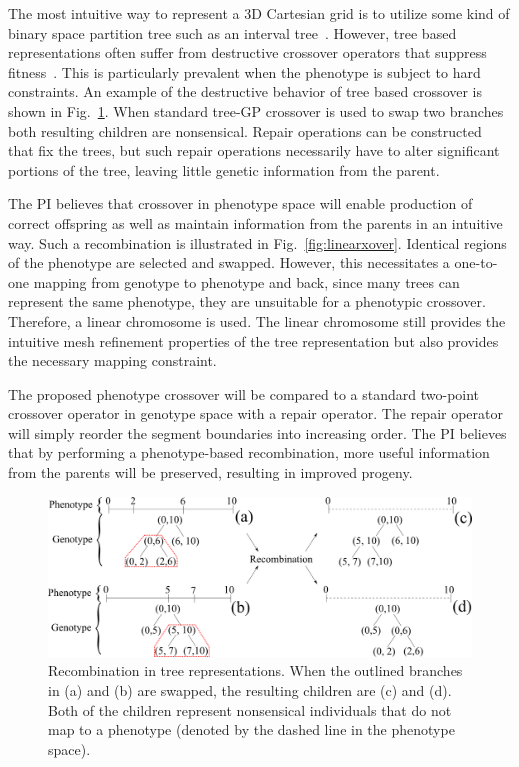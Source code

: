\documentclass{article}
\begin{document}
The most intuitive way to represent a 3D Cartesian grid is to utilize some kind of binary space partition tree such as an interval tree~\cite{ref:Franco1985}. However, tree based representations often suffer from destructive crossover operators that suppress fitness~\cite{ref:Sheneman2006}. This is particularly prevalent when the phenotype is subject to hard constraints. An example of the destructive behavior of tree based crossover is shown in Fig.~\ref{fig:treefail}. When standard tree-GP crossover is used to swap two branches both resulting children are nonsensical. Repair operations can be constructed that fix the trees, but such repair operations necessarily have to alter significant portions of the tree, leaving little genetic information from the parent.

The PI believes that crossover in phenotype space will enable production of correct offspring as well as maintain information from the parents in an intuitive way. Such a recombination is illustrated in Fig.~\ref{fig:linearxover}. Identical regions of the phenotype are selected and swapped. However, this necessitates a one-to-one mapping from genotype to phenotype and back, since many trees can represent the same phenotype, they are unsuitable for a phenotypic crossover. Therefore, a linear chromosome is used. The linear chromosome still provides the intuitive mesh refinement properties of the tree representation but also provides the necessary mapping constraint.

The proposed phenotype crossover will be compared to a standard two-point crossover operator in genotype space with a repair operator. The repair operator will simply reorder the segment boundaries into increasing order. The PI believes that by performing a phenotype-based recombination, more useful information from the parents will be preserved, resulting in improved progeny.
\begin{figure}
    \centering
    \includegraphics[width=\textwidth]{treefail}
    \caption{Recombination in tree representations. When the outlined branches in (a) and (b) are swapped, the resulting children are (c) and (d). Both of the children represent nonsensical individuals that do not map to a phenotype (denoted by the dashed line in the phenotype space).}
    \label{fig:treefail}
\end{figure}
\end{document}
